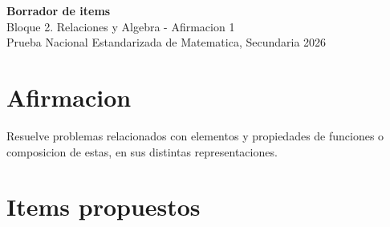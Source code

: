 \documentclass[12pt]{article}
\begin{document}
\begin{center}
  {\Large \textbf{Borrador de items}}\\
  {\large Bloque 2. Relaciones y Algebra - Afirmacion 1}\\[4pt]
  Prueba Nacional Estandarizada de Matematica, Secundaria 2026
\end{center}

\section*{Afirmacion}
Resuelve problemas relacionados con elementos y propiedades de funciones o composicion de estas, en sus distintas representaciones.

\section*{Items propuestos}
\end{document}
